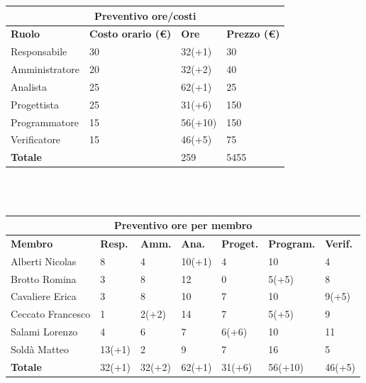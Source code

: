 \documentclass[a4paper, 12pt]{article}
\begin{document}
\begin{center}
	\begin{tabularx}{\textwidth}{|X|X|X|X|}
		\hline
		\multicolumn{4}{|c|}{\textbf{Preventivo ore/costi}}                                      \\
		\hline
		\hline
		\textbf{Ruolo}  & \textbf{Costo orario (\euro)} & \textbf{Ore} & \textbf{Prezzo (\euro)} \\
		\hline
		Responsabile    & 30                            & 32(+1)       & 30                     \\
		\hline
		Amministratore  & 20                            & 32(+2)       & 40                      \\
		\hline
		Analista        & 25                            & 62(+1)       & 25                       \\
		\hline
		Progettista     & 25                            & 31(+6)       & 150                      \\
		\hline
		Programmatore   & 15                            & 56(+10)       & 150                      \\
		\hline
		Verificatore    & 15                            & 46(+5)       & 75                      \\
		\hline
		\hline
		\textbf{Totale} &                               & 259          & 5455                    \\
		\hline
	\end{tabularx}\\[8pt]
	\mbox{}\\
\end{center}

\begin{center}
	\begin{tabularx}{\textwidth}{|X|X|X|X|X|X|X|}
		\hline
		\multicolumn{7}{|c|}{\textbf{Preventivo ore per membro}}                                      \\
		\hline
		\hline
		\textbf{Membro}  & \textbf{Resp.} & \textbf{Amm.} & \textbf{Ana.} &
		\textbf{Proget.} & \textbf{Program.} & \textbf{Verif.} \\
		\hline
		Alberti Nicolas    	&8 	&4	&10(+1)	&4	&10 &4	\\
		\hline
		Brotto Romina    	&3 	&8	&12	&0	&5(+5) &8	\\
		\hline
		Cavaliere Erica    	&3 	&8  &10  &7 &10 &9(+5)	\\
		\hline
		Ceccato Francesco   &1 	&2(+2)  &14 &7 &5(+5) &9	\\
		\hline
		Salami Lorenzo    	&4 	&6  &7 &6(+6) &10 &11	\\
		\hline
		Soldà Matteo    	&13(+1)	&2  &9 &7 &16 &5	\\
		\hline
		\hline
		\textbf{Totale} 	&32(+1) &32(+2) &62(+1) &31(+6) &56(+10) &46(+5)	\\
		\hline
	\end{tabularx}\\[8pt]
	\mbox{}\\
\end{center}
\end{document}
